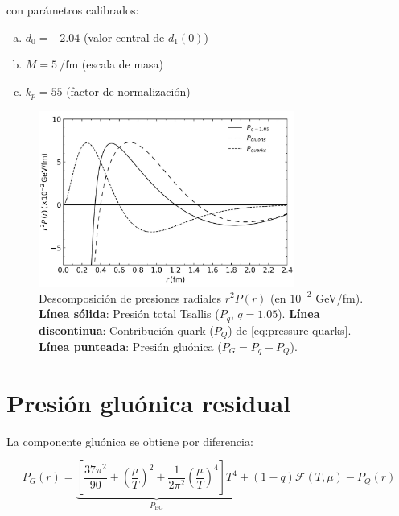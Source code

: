 con parámetros calibrados:
\begin{enumerate}[(a)]
    \item $d_0 = -2.04$ (valor central de $d_1(0)$)
    \item $M = \qty{5}{\per\femto\meter}$ (escala de masa)
    \item $k_p = 55$ (factor de normalización)
\end{enumerate}

\begin{figure}[h]
    \centering
    \includegraphics[width=0.75\textwidth]{./Images/PressureDistributionsTot-Q-G.png}
    \caption{
    Descomposición de presiones radiales $r^2P(r)$ (en $10^{-2}$ GeV/fm). 
    \textbf{Línea sólida}: Presión total Tsallis ($P_q$, $q=1.05$). 
    \textbf{Línea discontinua}: Contribución quark ($P_Q$) de \eqref{eq:pressure-quarks}. 
    \textbf{Línea punteada}: Presión gluónica ($P_G = P_q - P_Q$).
    }
    \label{fig:PresionDescompuesta}
\end{figure}

\section{Presión gluónica residual}
La componente gluónica se obtiene por diferencia:

\begin{equation}\label{eq:gluon-pressure}
P_G(r) = \underbrace{\left[\frac{37\pi^2}{90} + \left(\frac{\mu}{T}\right)^2 + \frac{1}{2\pi^2}\left(\frac{\mu}{T}\right)^4\right]T^4}_{P_{\text{BG}}} + (1-q)\mathcal{F}(T,\mu) - P_Q(r)
\end{equation}


